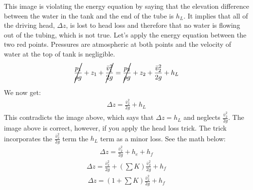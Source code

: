 \documentclass[letterpaper,10pt,english]{sphinxmanual}
\begin{document}
This image is violating the energy equation by saying that the elevation difference between the water in the tank and the end of the tube is \(h_L\). It implies that all of the driving head, \(\Delta z\), is lost to head loss and therefore that no water is flowing out of the tubing, which is not true. Let’s apply the energy equation between the two red points. Pressures are atmospheric at both points and the velocity of water at the top of tank is negligible.
\begin{equation}\label{equation:Fluids_Review/Fluids_Review_Design:Fluids_Review/Fluids_Review_Design:21}
\begin{split}\rlap{\Bigg/}\frac{p_{1}}{\rho g} + z_{1} + \rlap{\Bigg/}\frac{\bar v_{1}^2}{2g} = \rlap{\Bigg/}\frac{p_{2}}{\rho g} + z_{2} + \frac{\bar v_{2}^2}{2g} + h_L\end{split}
\end{equation}
We now get:
\begin{equation}\label{equation:Fluids_Review/Fluids_Review_Design:Fluids_Review/Fluids_Review_Design:22}
\begin{split}\Delta z = \frac{\bar v_2^2}{2g} + h_L\end{split}
\end{equation}
This contradicts the image above, which says that \(\Delta z = h_L\) and neglects \(\frac{\bar v_2^2}{2g}\). The image above is correct, however, if you apply the head loss trick. The trick incorporates the \(\frac{\bar v_2^2}{2g}\) term  the \(h_L\) term as a minor loss. See the math below:
\begin{equation}\label{equation:Fluids_Review/Fluids_Review_Design:Fluids_Review/Fluids_Review_Design:23}
\begin{split}\Delta z = \frac{\bar v_2^2}{2g} + h_e + h_f\end{split}
\end{equation}\begin{equation}\label{equation:Fluids_Review/Fluids_Review_Design:Fluids_Review/Fluids_Review_Design:24}
\begin{split}\Delta z = \frac{\bar v_2^2}{2g} + \left( \sum K \right) \frac{\bar v_2^2}{2g} + h_f\end{split}
\end{equation}\begin{equation}\label{equation:Fluids_Review/Fluids_Review_Design:Fluids_Review/Fluids_Review_Design:25}
\begin{split}\Delta z = \left( 1 + \sum K \right) \frac{\bar v_2^2}{2g} + h_f\end{split}
\end{equation}
\end{document}
